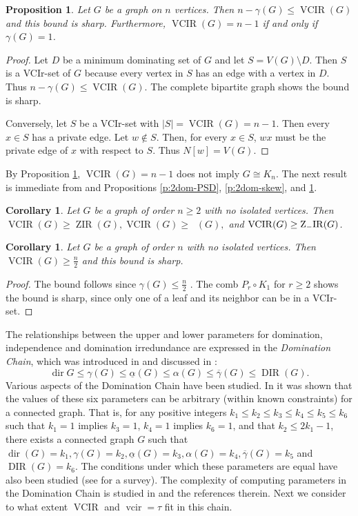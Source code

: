 \documentclass{article}
\numberwithin{figure}{section}
\numberwithin{table}{section}
\numberwithin{equation}{section}
\newtheorem{cor}[thm]{Corollary}
\newtheorem{prop}[thm]{Proposition}
\theoremstyle{definition}
\theoremstyle{definition}
\theoremstyle{definition}
\newcommand{\beq}{\begin{equation}}
\newcommand{\eeq}{\end{equation}}
\newcommand{\bpf}{\begin{proof}}
\newcommand{\epf}{\end{proof}\ms}
\newcommand{\ms}{\medskip}
\newcommand{\ol}{\overline}
\newcommand{\Zs}{\operatorname{Z}_-}
\newcommand{\dbar}{\ol\gamma}
\DeclareMathOperator{\dir}{dir}
\DeclareMathOperator{\DIR}{DIR}
\DeclareMathOperator{\ZIR}{ZIR}
\DeclareMathOperator{\ZpIR}{Z_+IR}
\newcommand{\ZsIR}{\Zs\!{\rm IR}}
\DeclareMathOperator{\VCIR}{VCIR}
\DeclareMathOperator{\vcir}{vcir}
\begin{document}
\begin{prop}\label{p:VCIRmax} 
    Let $G$ be a graph on $n$ vertices. Then  $n-\gamma(G)\le \VCIR(G)$ and this bound is sharp.  Furthermore, $\VCIR(G)=n-1$ if and only if $\gamma(G)=1$. 
\end{prop}

\bpf Let $D$ be a minimum dominating set of $G$ and let $S=V(G)\setminus D$.  Then $S$ is a VCIr-set of $G$ because every vertex in $S$ has an edge with a vertex in $D$. Thus $n-\gamma(G)\le \VCIR(G)$.  The complete bipartite graph shows the bound is sharp.

Conversely, let $S$ be a VCIr-set with $|S|=\VCIR(G)=n-1$. Then every $x \in S$ has a private edge. Let $w \notin S$. Then, for every $x \in S$, $wx$ must be the private edge of $x$ with respect to $S$. Thus $N[w]=V(G)$. 
\epf


  By Proposition \ref{p:VCIRmax},  $\VCIR(G)=n-1$ does not imply $G\cong K_n$.
The next result is immediate from \cite{ZIR} and Propositions \ref{p:2dom-PSD}, \ref{p:2dom-skew}, and \ref{p:VCIRmax}.

\begin{cor}\label{c:CVIRbig} Let $G$ be a  graph  of order $n\ge 2$   with no isolated vertices. Then $\VCIR(G)\ge \ZIR(G), \VCIR(G)\ge \ZpIR(G),$ and $\VCIR(G)\ge \ZsIR(G)$.
\end{cor}



\begin{cor} Let $G$ be a  graph of order $n$ with no isolated vertices. Then $\VCIR(G)\ge \frac n 2$ and this bound is sharp.
\end{cor}
\bpf The bound follows since $\gamma(G)\le \frac n 2$ \cite[Theorem 2.1]{HHS98}.  The comb $P_r\circ K_1$ for $r\ge 2$ shows the bound is sharp, since only one of a leaf and its neighbor can be in a VCIr-set.
\epf


  The relationships between the upper and lower parameters for domination, independence and domination irredundance  are expressed in the  \emph{Domination Chain},  which was  introduced in \cite{CHM78} and discussed in \cite{MR21}: 
\beq\label{eqDomChain} \dir{G} \leq \gamma(G) \leq \underline{\alpha}(G) \leq \alpha(G) \leq \ol{\gamma}(G) \leq \DIR(G).\eeq
  Various aspects of the Domination Chain have been studied. In \cite{CM93} it was shown that the values of these six parameters can be arbitrary (within known constraints) for a connected graph. That is, for any positive integers $k_1\leq k_2\leq k_3\leq k_4\leq k_5\leq k_6$ such that $k_1=1$ implies $k_3=1$, $k_4=1$ implies $k_6=1$, and that $k_2\leq 2k_1-1$, there exists a connected graph $G$ such that $\dir(G)=k_1, \gamma(G)=k_2, \underline{\alpha}(G)=k_3, \alpha(G)=k_4, \dbar(G)=k_5$ and $\DIR(G)=k_6$. The conditions under which these parameters are equal have also been studied (see \cite{MR21} for a survey). The complexity of computing parameters in the Domination Chain is studied in \cite{BBCF20domchain} and the references therein.
 Next we consider to what extent $\VCIR$ and $\vcir=\tau$ fit in  this chain.
\end{document}
